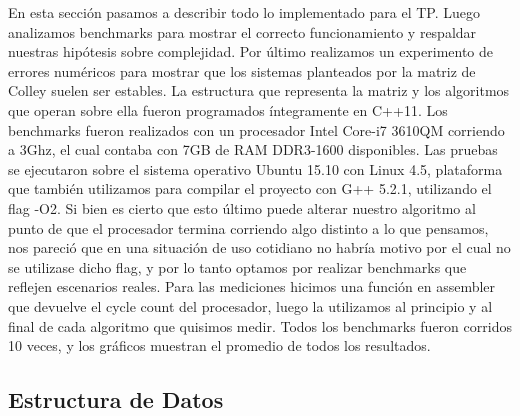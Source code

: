 En esta sección pasamos a describir todo lo implementado para el TP. Luego analizamos benchmarks para mostrar el correcto funcionamiento y respaldar nuestras hipótesis sobre complejidad. Por último realizamos un experimento de errores numéricos para mostrar que los sistemas planteados por la matriz de Colley suelen ser estables. La estructura que representa la matriz y los algoritmos que operan sobre ella fueron programados íntegramente en C++11. Los benchmarks fueron realizados con un procesador Intel Core-i7 3610QM corriendo a 3Ghz, el cual contaba con 7GB de RAM DDR3-1600 disponibles. Las pruebas se ejecutaron sobre el sistema operativo Ubuntu 15.10 con Linux 4.5, plataforma que también utilizamos para compilar el proyecto con G++ 5.2.1, utilizando el flag -O2. Si bien es cierto que esto último puede alterar nuestro algoritmo al punto de que el procesador termina corriendo algo distinto a lo que pensamos, nos pareció que en una situación de uso cotidiano no habría motivo por el cual no se utilizase dicho flag, y por lo tanto optamos por realizar benchmarks que reflejen escenarios reales. Para las mediciones hicimos una función en assembler que devuelve el cycle count del procesador, luego la utilizamos al principio y al final de cada algoritmo que quisimos medir. Todos los benchmarks fueron corridos 10 veces, y los gráficos muestran el promedio de todos los resultados.

\subsection{Estructura de Datos}


